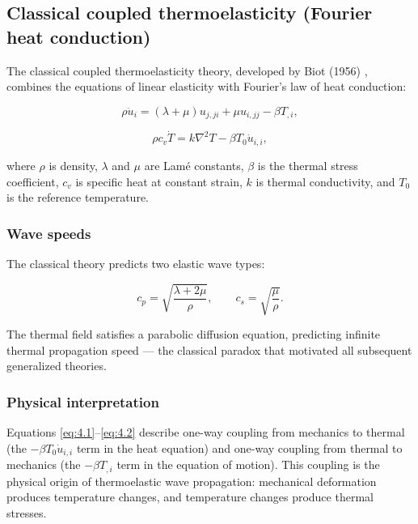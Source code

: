 \subsection{Classical coupled thermoelasticity (Fourier heat conduction)}
\label{sec:4.2}

The classical coupled thermoelasticity theory, developed by Biot (1956) \cite{Biot1956}, combines the equations of linear elasticity with Fourier's law of heat conduction:

\begin{equation}
\rho\ddot{u}_i = (\lambda + \mu)u_{j,ji} + \mu u_{i,jj} - \beta T_{,i},
\label{eq:4.1}
\end{equation}

\begin{equation}
\rho c_v \dot{T} = k\nabla^2 T - \beta T_0 \dot{u}_{i,i},
\label{eq:4.2}
\end{equation}

where $\rho$ is density, $\lambda$ and $\mu$ are Lam\'e constants, $\beta$ is the thermal stress coefficient, $c_v$ is specific heat at constant strain, $k$ is thermal conductivity, and $T_0$ is the reference temperature.

\subsubsection{Wave speeds}

The classical theory predicts two elastic wave types:

\begin{equation}
c_p = \sqrt{\frac{\lambda + 2\mu}{\rho}},
\qquad
c_s = \sqrt{\frac{\mu}{\rho}}.
\label{eq:4.3}
\end{equation}

The thermal field satisfies a parabolic diffusion equation, predicting infinite thermal propagation speed --- the classical paradox that motivated all subsequent generalized theories.

\subsubsection{Physical interpretation}

Equations \eqref{eq:4.1}--\eqref{eq:4.2} describe one-way coupling from mechanics to thermal (the $-\beta T_0\dot{u}_{i,i}$ term in the heat equation) and one-way coupling from thermal to mechanics (the $-\beta T_{,i}$ term in the equation of motion). This coupling is the physical origin of thermoelastic wave propagation: mechanical deformation produces temperature changes, and temperature changes produce thermal stresses.

